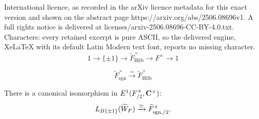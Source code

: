 \documentclass[10pt,a4paper]{amsart}
\newcommand{\Hilbert}{\mathrm{Hilb}}
\newcommand{\Langlands}{\textnormal{\textsf{L}}}
\newcommand{\complexes}{\mathbf C}
\newcommand{\deloop}{\textnormal{\textsf{B}}}
\newcommand{\extension}{\textnormal{\textsf{E}}}
\newcommand{\sgn}{\mathrm{sgn}}
\begin{document}
International licence, as recorded in the arXiv licence metadata for this exact version and shown on the abstract page https://arxiv.org/abs/2506.08696v1. A full rights notice is delivered at licenses/arxiv-2506.08696-CC-BY-4.0.txt. Characters: every retained excerpt is pure ASCII, so the delivered engine, XeLaTeX with its default Latin Modern text font, reports no missing character.
\begin{equation}
\label{eq-hilbert-cover}
1 \rightarrow \{\pm 1\} \rightarrow \widetilde F^{\times}_{\Hilbert} \rightarrow F^{\times} \rightarrow 1
\end{equation}

\begin{equation}
\label{eq-sign-cover-isomorphism-hilbert-cover}
\widetilde F^{\times}_{\sgn} \xrightarrow{\simeq} \widetilde F^{\times}_{\Hilbert}
\end{equation}

\begin{cor}
\label{cor-sign-cover-dual-identification}
There is a canonical isomorphism in $\extension^1(F^{\times}_{/2}, \complexes^{\times})$:
\begin{equation}
\label{eq-sign-cover-dual-identification}
\Langlands_{\deloop\{\pm 1\}}(\widetilde W_F) \xrightarrow{\simeq} \widetilde F^{\times}_{\sgn, /2}.
\end{equation}
\end{cor}
\end{document}
